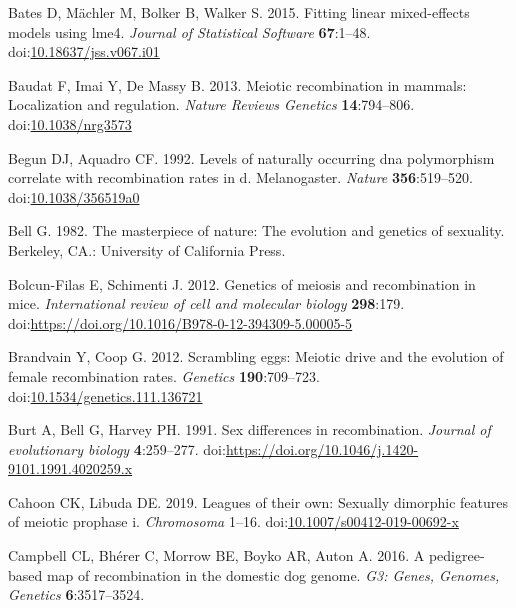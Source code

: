 \documentclass[
]{article}
\begin{document}
\leavevmode\hypertarget{ref-lme4}{}%
Bates D, Mächler M, Bolker B, Walker S. 2015. Fitting linear
mixed-effects models using lme4. \emph{Journal of Statistical Software}
\textbf{67}:1--48.
doi:\href{https://doi.org/10.18637/jss.v067.i01}{10.18637/jss.v067.i01}

\leavevmode\hypertarget{ref-baudat2013}{}%
Baudat F, Imai Y, De Massy B. 2013. Meiotic recombination in mammals:
Localization and regulation. \emph{Nature Reviews Genetics}
\textbf{14}:794--806.
doi:\href{https://doi.org/10.1038/nrg3573}{10.1038/nrg3573}

\leavevmode\hypertarget{ref-begun1992}{}%
Begun DJ, Aquadro CF. 1992. Levels of naturally occurring dna
polymorphism correlate with recombination rates in d. Melanogaster.
\emph{Nature} \textbf{356}:519--520.
doi:\href{https://doi.org/10.1038/356519a0}{10.1038/356519a0}

\leavevmode\hypertarget{ref-bell1982}{}%
Bell G. 1982. The masterpiece of nature: The evolution and genetics of
sexuality. Berkeley, CA.: University of California Press.

\leavevmode\hypertarget{ref-bolcun2012}{}%
Bolcun-Filas E, Schimenti J. 2012. Genetics of meiosis and recombination
in mice. \emph{International review of cell and molecular biology}
\textbf{298}:179.
doi:\href{https://doi.org/https://doi.org/10.1016/B978-0-12-394309-5.00005-5}{https://doi.org/10.1016/B978-0-12-394309-5.00005-5}

\leavevmode\hypertarget{ref-brandvain2012scrambling}{}%
Brandvain Y, Coop G. 2012. Scrambling eggs: Meiotic drive and the
evolution of female recombination rates. \emph{Genetics}
\textbf{190}:709--723.
doi:\href{https://doi.org/10.1534/genetics.111.136721}{10.1534/genetics.111.136721}

\leavevmode\hypertarget{ref-burt1991}{}%
Burt A, Bell G, Harvey PH. 1991. Sex differences in recombination.
\emph{Journal of evolutionary biology} \textbf{4}:259--277.
doi:\href{https://doi.org/https://doi.org/10.1046/j.1420-9101.1991.4020259.x}{https://doi.org/10.1046/j.1420-9101.1991.4020259.x}

\leavevmode\hypertarget{ref-CahoonLibuda2019}{}%
Cahoon CK, Libuda DE. 2019. Leagues of their own: Sexually dimorphic
features of meiotic prophase i. \emph{Chromosoma} 1--16.
doi:\href{https://doi.org/10.1007/s00412-019-00692-x}{10.1007/s00412-019-00692-x}

\leavevmode\hypertarget{ref-campbell2016}{}%
Campbell CL, Bhérer C, Morrow BE, Boyko AR, Auton A. 2016. A
pedigree-based map of recombination in the domestic dog genome.
\emph{G3: Genes, Genomes, Genetics} \textbf{6}:3517--3524.
\end{document}
